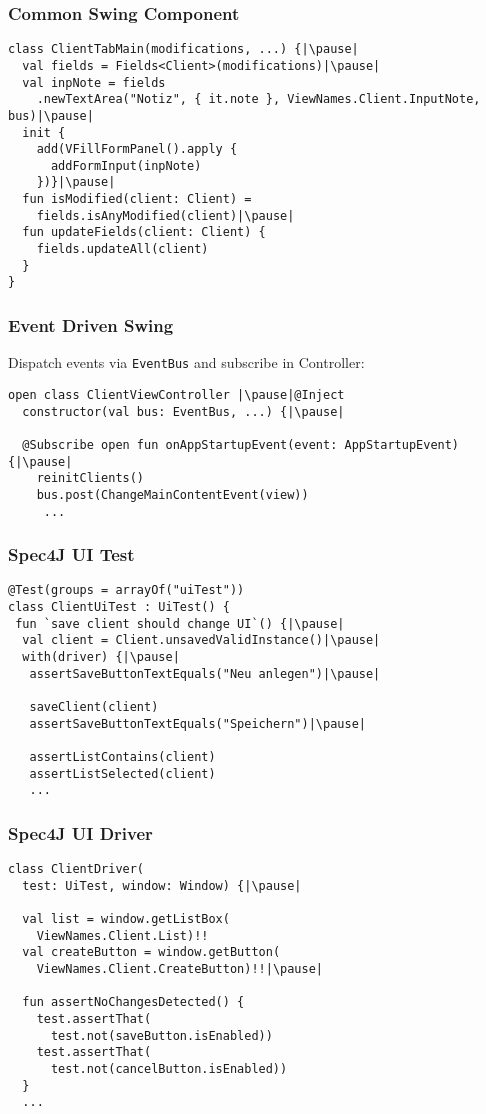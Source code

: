 
\begin{frame}[fragile] \frametitle{Common Swing Component}
\begin{lstlisting}
class ClientTabMain(modifications, ...) {|\pause|
  val fields = Fields<Client>(modifications)|\pause|
  val inpNote = fields
    .newTextArea("Notiz", { it.note }, ViewNames.Client.InputNote, bus)|\pause|
  init {
    add(VFillFormPanel().apply {
      addFormInput(inpNote)
    })}|\pause|
  fun isModified(client: Client) = 
    fields.isAnyModified(client)|\pause|
  fun updateFields(client: Client) {
    fields.updateAll(client)
  }
}
\end{lstlisting}
\end{frame}

\begin{frame}[fragile] \frametitle{Event Driven Swing}
Dispatch events via \texttt{EventBus} and subscribe in Controller:
\begin{lstlisting}
open class ClientViewController |\pause|@Inject
  constructor(val bus: EventBus, ...) {|\pause|
     
  @Subscribe open fun onAppStartupEvent(event: AppStartupEvent) {|\pause|
    reinitClients()
    bus.post(ChangeMainContentEvent(view))
     ...
\end{lstlisting}
\end{frame}

\begin{frame}[fragile] \frametitle{Spec4J UI Test}
\begin{lstlisting}
@Test(groups = arrayOf("uiTest"))
class ClientUiTest : UiTest() {
 fun `save client should change UI`() {|\pause|
  val client = Client.unsavedValidInstance()|\pause|
  with(driver) {|\pause|
   assertSaveButtonTextEquals("Neu anlegen")|\pause|

   saveClient(client)
   assertSaveButtonTextEquals("Speichern")|\pause|

   assertListContains(client)
   assertListSelected(client)
   ...
\end{lstlisting}
\end{frame}


\begin{frame}[fragile] \frametitle{Spec4J UI Driver}
\begin{lstlisting}
class ClientDriver(
  test: UiTest, window: Window) {|\pause|
  
  val list = window.getListBox(
    ViewNames.Client.List)!!
  val createButton = window.getButton(
    ViewNames.Client.CreateButton)!!|\pause|
    
  fun assertNoChangesDetected() {
    test.assertThat(
      test.not(saveButton.isEnabled))
    test.assertThat(
      test.not(cancelButton.isEnabled))
  }
  ...
\end{lstlisting}
\end{frame}





